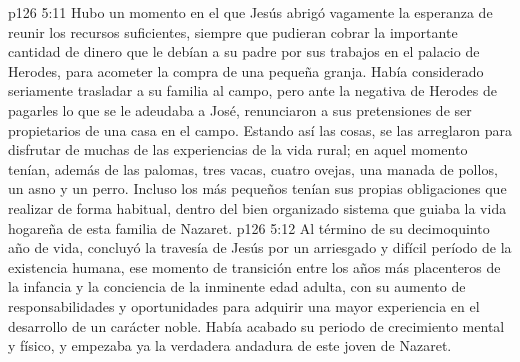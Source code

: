 \vs p126 5:11 Hubo un momento en el que Jesús abrigó vagamente la esperanza de reunir los recursos suficientes, siempre que pudieran cobrar la importante cantidad de dinero que le debían a su padre por sus trabajos en el palacio de Herodes, para acometer la compra de una pequeña granja. Había considerado seriamente trasladar a su familia al campo, pero ante la negativa de Herodes de pagarles lo que se le adeudaba a José, renunciaron a sus pretensiones de ser propietarios de una casa en el campo. Estando así las cosas, se las arreglaron para disfrutar de muchas de las experiencias de la vida rural; en aquel momento tenían, además de las palomas, tres vacas, cuatro ovejas, una manada de pollos, un asno y un perro. Incluso los más pequeños tenían sus propias obligaciones que realizar de forma habitual, dentro del bien organizado sistema que guiaba la vida hogareña de esta familia de Nazaret.
\vs p126 5:12 \pc Al término de su decimoquinto año de vida, concluyó la travesía de Jesús por un arriesgado y difícil período de la existencia humana, ese momento de transición entre los años más placenteros de la infancia y la conciencia de la inminente edad adulta, con su aumento de responsabilidades y oportunidades para adquirir una mayor experiencia en el desarrollo de un carácter noble. Había acabado su periodo de crecimiento mental y físico, y empezaba ya la verdadera andadura de este joven de Nazaret.
